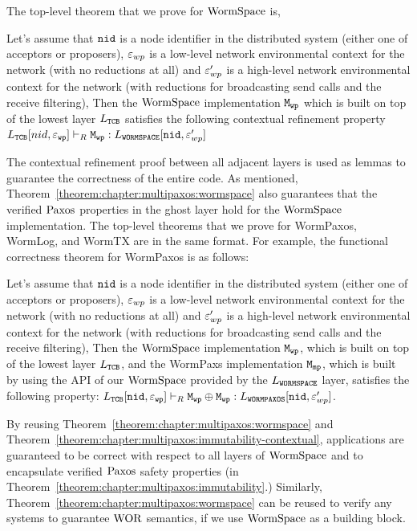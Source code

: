 The top-level theorem that we prove for $\mathrm{WormSpace}$ is, 
\begin{theorem}
\label{theorem:chapter:multipaxos:wormspace}
Let's assume that ${\mathrm{\texttt{nid}}}$ is a node identifier in the distributed system (either one of acceptors or proposers),
${\varepsilon}_{wp}$ is a low-level network environmental context for the network (with no reductions at all) and 
${\varepsilon}_{wp}'$ is a high-level network environmental context for the network (with reductions for broadcasting send calls and the
receive filtering),
 Then the $\mathrm{WormSpace}$ implementation ${\mathrm{\texttt{M}}}_{{\mathrm{\texttt{wp}}}}$ which is built on top of the lowest layer $L_{{\mathrm{\texttt{TCB}}}}$ satisfies 
 the following contextual refinement property
$L_{{\mathrm{\texttt{TCB}}}}[nid, {\varepsilon}_{{\mathrm{\texttt{wp}}}}] \vdash_{R} {\mathrm{\texttt{M}}}_{{\mathrm{\texttt{wp}}}} : L_{{\mathrm{\texttt{WORMSPACE}}}}[{\mathrm{\texttt{nid}}}, {\varepsilon}_{wp}']$
\end{theorem}
The contextual refinement proof between all adjacent layers is used as lemmas to guarantee the correctness of the entire code. 
As mentioned, 
Theorem~\ref{theorem:chapter:multipaxos:wormspace} also guarantees that the verified $\mathrm{Paxos}$ properties in the ghost layer 
hold for the $\mathrm{WormSpace}$ implementation.
The top-level theorems that we prove for WormPaxos, WormLog, and WormTX are in the same format.
For example, the functional correctness theorem for WormPaxos is as follows:
\begin{theorem}
\label{theorem:chapter:multipaxos:wompaxos}
Let's assume that ${\mathrm{\texttt{nid}}}$ is a node identifier in the distributed system (either one of acceptors or proposers),
${\varepsilon}_{wp}$ is a low-level network environmental context for the network (with no reductions at all) and 
${\varepsilon}_{wp}'$ is a high-level network environmental context for the network (with reductions for broadcasting send calls and the
receive filtering),
 Then the $\mathrm{WormSpace}$ implementation ${\mathrm{\texttt{M}}}_{{\mathrm{\texttt{wp}}}}$, which is built on top of the lowest layer $L_{{\mathrm{\texttt{TCB}}}}$,  and 
 the WormPaxs implementation ${\mathrm{\texttt{M}}}_{{\mathrm{\texttt{mp}}}}$, which is built by using the API of our $\mathrm{WormSpace}$ provided by the $L_{{\mathrm{\texttt{WORMSPACE}}}}$ layer, satisfies the following property:
 $L_{{\mathrm{\texttt{TCB}}}}[{\mathrm{\texttt{nid}}}, {\varepsilon}_{{\mathrm{\texttt{wp}}}}] \vdash_{R} {{\mathrm{\texttt{M}}}_{{\mathrm{\texttt{wp}}}}} \oplus {{\mathrm{\texttt{M}}}_{{\mathrm{\texttt{wp}}}}} : L_{{\mathrm{\texttt{WORMPAXOS}}}}[{\mathrm{\texttt{nid}}}, {\varepsilon}_{wp}']$.
\end{theorem}
By reusing Theorem~\ref{theorem:chapter:multipaxos:wormspace} and Theorem~\ref{theorem:chapter:multipaxos:immutability-contextual},
applications are guaranteed to be correct with respect to all layers of $\mathrm{WormSpace}$ and
 to encapsulate verified $\mathrm{Paxos}$ safety properties (in Theorem~\ref{theorem:chapter:multipaxos:immutability}.)
 Similarly, Theorem~\ref{theorem:chapter:multipaxos:wormspace} can be reused to verify any systems to guarantee $\mathrm{WOR}$ semantics, 
if we use $\mathrm{WormSpace}$ as a building block. 
	
